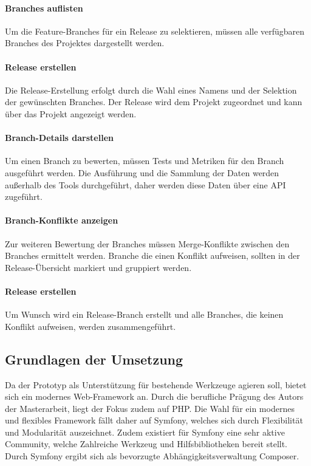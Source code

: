 \paragraph{Branches auflisten}
Um die Feature-Branches für ein Release zu selektieren, müssen alle verfügbaren Branches des Projektes dargestellt werden. 

\paragraph{Release erstellen}
Die Release-Erstellung erfolgt durch die Wahl eines Namens und der Selektion der gewünschten Branches. Der Release wird dem Projekt zugeordnet und kann über das Projekt angezeigt werden.

\paragraph{Branch-Details darstellen}
Um einen Branch zu bewerten, müssen Tests und Metriken für den Branch ausgeführt werden. Die Ausführung und die Sammlung der Daten werden außerhalb des Tools durchgeführt, daher werden diese Daten über eine API zugeführt.

\paragraph{Branch-Konflikte anzeigen}
Zur weiteren Bewertung der Branches müssen Merge-Konflikte zwischen den Branches ermittelt werden. Branche die einen Konflikt aufweisen, sollten in der Release-Übersicht markiert und gruppiert werden.

\paragraph{Release erstellen}
Um Wunsch wird ein Release-Branch erstellt und alle Branches, die keinen Konflikt aufweisen, werden zusammengeführt.

\subsection{Grundlagen der Umsetzung}

Da der Prototyp als Unterstützung für bestehende Werkzeuge agieren soll, bietet sich ein modernes Web-Framework an. Durch die berufliche Prägung des Autors der Masterarbeit, liegt der Fokus zudem auf PHP. Die Wahl für ein modernes und flexibles Framework fällt daher auf Symfony, welches sich durch Flexibilität und Modularität auszeichnet. Zudem existiert für Symfony eine sehr aktive Community, welche Zahlreiche Werkzeug und Hilfsbibliotheken bereit stellt. Durch Symfony ergibt sich als bevorzugte Abhängigkeitsverwaltung Composer.  

